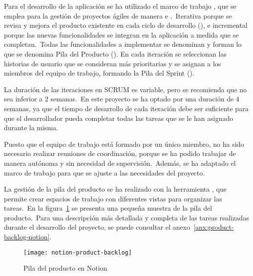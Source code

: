 
Para el desarrollo de la aplicación se ha utilizado el marco de trabajo , que se emplea para la gestión
de proyectos ágiles de manera  e .\ Iterativa porque se revisa y mejora
el producto existente en cada ciclo de desarrollo (), e incremental porque las nuevas
funcionalidades se integran en la aplicación a medida que se completan.\ Todas las funcionalidades a implementar se
denominan  y forman lo que se denomina Pila del Producto ().
En cada iteración se seleccionan las historias de usuario que se consideran más prioritarias y se asignan a los
miembros del equipo de trabajo, formando la Pila del Sprint ().

La duración de las iteraciones en SCRUM es variable, pero se recomienda que no sea inferior a 2 semanas.\ En este
proyecto se ha optado por una duración de 4 semanas, ya que el tiempo de desarrollo de cada iteración debe ser
suficiente para que el desarrollador pueda completar todas las tareas que se le han asignado durante la misma.

Puesto que el equipo de trabajo está formado por un único miembro, no ha sido necesario realizar reuniones de
coordinación, porque se ha podido trabajar de manera autónoma y sin necesidad de supervisión.\ Además, se ha
adaptado el marco de trabajo para que se ajuste a las necesidades del proyecto.

La gestión de la pila del producto se ha realizado con la herramienta , que permite crear espacios
de trabajo con diferentes vistas para organizar las tareas.\ En la figura~\ref{fig:notion-product-backlog} se presenta
una pequeña muestra de la pila del producto.\ Para una descripción más detallada y completa de las tareas realizadas
durante el desarrollo del proyecto, se puede consultar el anexo~\ref{anx:product-backlog-notion}.

\begin{figure}[H]
	\centering
	\texttt{[image: notion-product-backlog]}
	\caption{Pila del producto en Notion}
	\label{fig:notion-product-backlog}
\end{figure}


